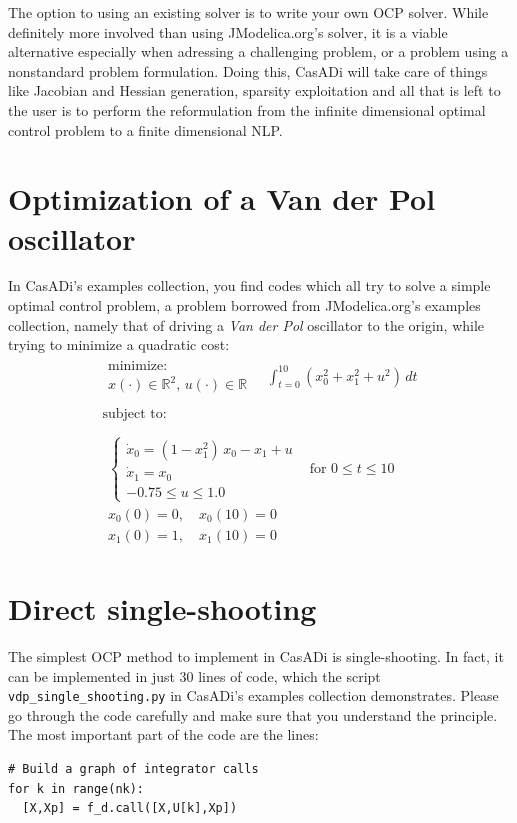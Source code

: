\documentclass[a4paper,12pt]{book}
\begin{document}
{The option to using an existing solver is to write your own OCP solver. While definitely more involved than using JModelica.org's solver, it is a viable alternative especially when adressing a challenging problem, or a problem using a nonstandard problem formulation. Doing this,   CasADi will take care of things like Jacobian and Hessian generation, sparsity exploitation and all that is left to the user is to perform the reformulation from the infinite dimensional optimal control problem to a finite dimensional NLP.

\section{Optimization of a Van der Pol oscillator}
In CasADi's examples collection, you find codes which all try to solve a simple optimal control problem, a problem borrowed from JModelica.org's examples collection, namely that of driving a \emph{Van der Pol} oscillator to the origin, while trying to minimize a quadratic cost:
\begin{equation}
\begin{array}{lc}
\begin{array}{l}
\text{minimize:} \\
x(\cdot) \in \mathbb{R}^2, \, u(\cdot) \in \mathbb{R}
\end{array}
\quad \displaystyle \int_{t=0}^{10}{(x_0^2 + x_1^2 + u^2) \, dt}
\\
\\
\text{subject to:} \\
\\
\begin{array}{ll}
\left\{
\begin{array}{l}
\dot{x}_0 = (1-x_1^2) \, x_0 - x_1 + u \\
\dot{x}_1 = x_0 \\
-0.75 \le u \le 1.0
\end{array} \right. & \text{for $0 \le t \le 10$} \\
x_0(0)=0, \quad x_0(10)=0  \\
x_1(0)=1, \quad x_1(10)=0  
\end{array}
\end{array}
\label{eq:vdp}
\end{equation}

\section{Direct single-shooting}
The simplest OCP method to implement in CasADi is single-shooting. In fact, it can be implemented in just 30 lines of code, which the script {\texttt{vdp\_single\_shooting.py}} in CasADi's examples collection demonstrates. Please go through the code carefully and make sure that you understand the principle. The most important part of the code are the lines:
\begin{verbatim}
# Build a graph of integrator calls
for k in range(nk):
  [X,Xp] = f_d.call([X,U[k],Xp])
\end{verbatim}

}
\end{document}
